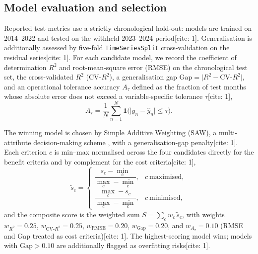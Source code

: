 \documentclass[pdflatex,sn-mathphys-ay]{sn-jnl}
\begin{document}
\subsection{Model evaluation and selection}\label{sec:saw}
Reported test metrics use a strictly chronological hold-out: models are trained on 2014--2022 and tested on the withheld 2023--2024 period[cite: 1]. Generalisation is additionally assessed by five-fold \texttt{TimeSeriesSplit} cross-validation on the residual series[cite: 1]. For each candidate model, we record the coefficient of determination $R^{2}$ and root-mean-square error (RMSE) on the chronological test set, the cross-validated $R^{2}$ ($\mathrm{CV}\text{-}R^{2}$), a generalisation gap $\mathrm{Gap}=\lvert R^{2}-\mathrm{CV}\text{-}R^{2}\rvert$, and an operational tolerance accuracy $A_{\tau}$ defined as the fraction of test months whose absolute error does not exceed a variable-specific tolerance $\tau$[cite: 1],
\begin{equation}
A_{\tau}=\frac{1}{N}\sum_{n=1}^{N}\mathbf{1}\!\big(\lvert y_{n}-\hat{y}_{n}\rvert \le \tau\big).
\end{equation}

The winning model is chosen by Simple Additive Weighting (SAW), a multi-attribute decision-making scheme \citep{Hwang1981}, with a generalisation-gap penalty[cite: 1]. Each criterion $c$ is min--max normalised across the four candidates directly for the benefit criteria and by complement for the cost criteria[cite: 1],
\begin{equation}
\tilde{s}_{c}=
\begin{cases}
\dfrac{s_{c}-\min_{c}}{\max_{c}-\min_{c}}, & c\ \text{maximised},\\[1.2ex]
\dfrac{\max_{c}-s_{c}}{\max_{c}-\min_{c}}, & c\ \text{minimised},
\end{cases}
\end{equation}
and the composite score is the weighted sum $S=\sum_{c} w_{c}\,\tilde{s}_{c}$, with weights $w_{R^{2}}=0.25$, $w_{\mathrm{CV}\text{-}R^{2}}=0.25$, $w_{\mathrm{RMSE}}=0.20$, $w_{\mathrm{Gap}}=0.20$, and $w_{A_{\tau}}=0.10$ (RMSE and Gap treated as cost criteria)[cite: 1]. The highest-scoring model wins; models with $\mathrm{Gap}>0.10$ are additionally flagged as overfitting risks[cite: 1].
\end{document}
